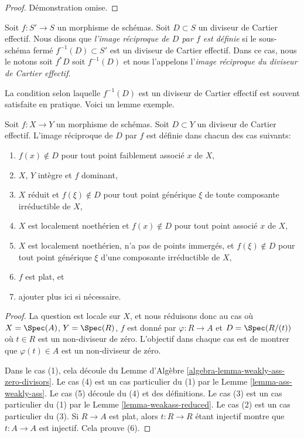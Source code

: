 \begin{proof}
Démonstration omise.
\end{proof}

\begin{definition}
\label{definition-pullback-effective-Cartier-divisor}
Soit  $f : S' \to S$  un morphisme de schémas. Soit  $D \subset S$  un diviseur de
Cartier effectif. Nous disons que  {\it  l'image réciproque de
 $D$  par  $f$  est définie}  si le sous-schéma fermé
 $f^{-1}(D) \subset S'$  est un diviseur de Cartier effectif. Dans ce cas, nous le notons soit
 $f^*D$  soit  $f^{-1}(D)$  et nous l'appelons l'{\it image réciproque
du diviseur de Cartier effectif}.
\end{definition}

\noindent
La condition selon laquelle  $f^{-1}(D)$  est un diviseur de Cartier effectif est
souvent satisfaite en pratique. Voici un lemme exemple.

\begin{lemma}
\label{lemma-pullback-effective-Cartier-defined}
Soit  $f : X \to Y$  un morphisme de schémas. Soit  $D \subset Y$  un diviseur de
Cartier effectif. L'image réciproque de  $D$  par  $f$  est définie
dans chacun des cas suivants:
\begin{enumerate}
\item $f(x) \not \in D$  pour tout point faiblement associé  $x$  de  $X$,
\item $X$,  $Y$  intègre et  $f$  dominant,
\item $X$  réduit et  $f(\xi) \not \in D$  pour tout point générique  $\xi$  de
toute composante irréductible de  $X$,
\item $X$  est localement noethérien et  $f(x) \not \in D$  pour tout point associé
 $x$  de  $X$,
\item $X$  est localement noethérien, n'a pas de points immergés, et
 $f(\xi) \not \in D$  pour tout point générique  $\xi$  d'une composante irréductible
de  $X$,
\item $f$  est plat, et
\item ajouter plus ici si nécessaire.
\end{enumerate}
\end{lemma}

\begin{proof}
La question est locale sur  $X$, et nous réduisons donc au cas où
 $X = \Spec(A)$,  $Y = \Spec(R)$,  $f$  est donné par  $\varphi : R \to A$  et
 $D = \Spec(R/(t))$  où  $t \in R$  est un non-diviseur de zéro. L'objectif dans
chaque cas est de montrer que  $\varphi(t) \in A$  est un non-diviseur de zéro.

\medskip\noindent
Dans le cas (1), cela découle du Lemme d'Algèbre  \ref{algebra-lemma-weakly-ass-zero-divisors}. Le cas (4) est un
cas particulier du (1) par le Lemme  \ref{lemma-ass-weakly-ass}. Le cas (5) découle du (4) et des
définitions. Le cas (3) est un cas particulier du (1) par le Lemme  \ref{lemma-weakass-reduced}.
Le cas (2) est un cas particulier du (3). Si  $R \to A$  est plat, alors
 $t : R \to R$  étant injectif montre que  $t : A \to A$  est injectif. Cela prouve (6).
\end{proof}

